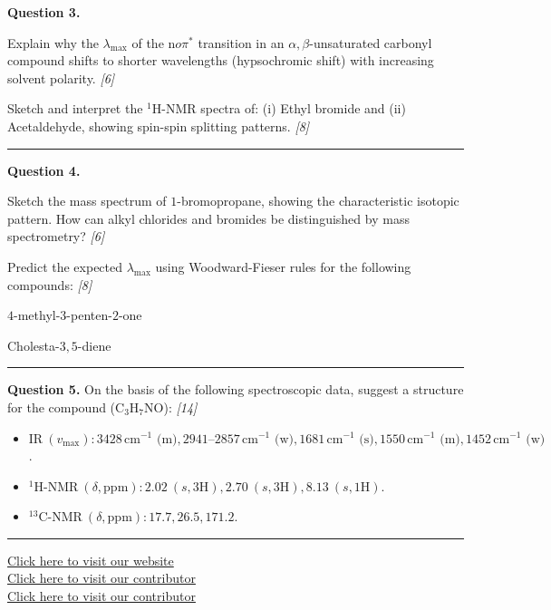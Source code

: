 \documentclass[11pt,a4paper]{article}
\newcommand{\pts}[1]{\hfill   \textit{[#1]}}
\begin{document}
\noindent   \textbf{Question 3.}

\begin{parts}
  \item Explain why the $\lambda_{\max}$ of the $ \text{n}  o \pi^*$ transition in an $\alpha,\beta$-unsaturated carbonyl compound shifts to shorter wavelengths (hypsochromic shift) with increasing solvent polarity. \pts{6}
  \item Sketch and interpret the $^1 \text{H}$-NMR spectra of: (i) Ethyl bromide and (ii) Acetaldehyde, showing spin-spin splitting patterns. \pts{8}
\end{parts}

\medskip\rule{\linewidth}{0.2pt}




\noindent   \textbf{Question 4.}

\begin{parts}
  \item Sketch the mass spectrum of $1$-bromopropane, showing the characteristic isotopic pattern. How can alkyl chlorides and bromides be distinguished by mass spectrometry? \pts{6}
  \item Predict the expected $\lambda_{\max}$ using Woodward-Fieser rules for the following compounds: \pts{8}
  
\begin{parts}
    \item $4$-methyl-$3$-penten-$2$-one
    \item Cholesta-$3,5$-diene
  \end{parts}
\end{parts}

\medskip\rule{\linewidth}{0.2pt}




\noindent   \textbf{Question 5.} On the basis of the following spectroscopic data, suggest a structure for the compound ($ \text{C}_3 \text{H}_7 \text{NO}$): \pts{14}

\begin{itemize}
  \item $ \text{IR} \ (v_{\max}): 3428\, \text{cm}^{-1} \text{ (m)}, 2941 \text{--}2857\, \text{cm}^{-1} \text{ (w)}, 1681\, \text{cm}^{-1} \text{ (s)}, 1550\, \text{cm}^{-1} \text{ (m)}, 1452\, \text{cm}^{-1} \text{ (w)}$.
  \item $^1 \text{H-NMR} \ (\delta,  \text{ppm}): 2.02 \ (s, 3 \text{H}), 2.70 \ (s, 3 \text{H}), 8.13 \ (s, 1 \text{H})$.
  \item $^{13} \text{C-NMR} \ (\delta,  \text{ppm}): 17.7, 26.5, 171.2$.
\end{itemize}

\vfill
\rule{\linewidth}{0.4pt}

\begin{center}\small
  \href{https://bhu-exam.vercel.app/}{Click here to visit our website}\\[4pt]
  \href{https://me-aryan.vercel.app/}{Click here to visit our contributor}\\[4pt]
  \href{https://quashan-me.vercel.app/}{Click here to visit our contributor}
\end{center}
\end{document}
